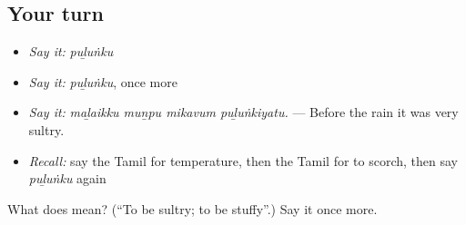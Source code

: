 \subsection*{Your turn}
\begin{itemize}
\raggedright
  \item \emph{Say it:} \emph{puḻuṅku}
  \item \emph{Say it:} \emph{puḻuṅku}, once more
  \item \emph{Say it:} \emph{maḻaikku muṉpu mikavum puḻuṅkiyatu.} — Before the rain it was very sultry.
  \item \emph{Recall:} say the Tamil for temperature, then the Tamil for to scorch, then say \emph{puḻuṅku} again
\end{itemize}

\begin{tcolorbox}[breakable,colback=teal!4,colframe=teal!35!black,title={Before you move on}]
What does  mean? (\textquotedblleft{}To be sultry; to be stuffy\textquotedblright{}.) Say it once more.
\end{tcolorbox}
